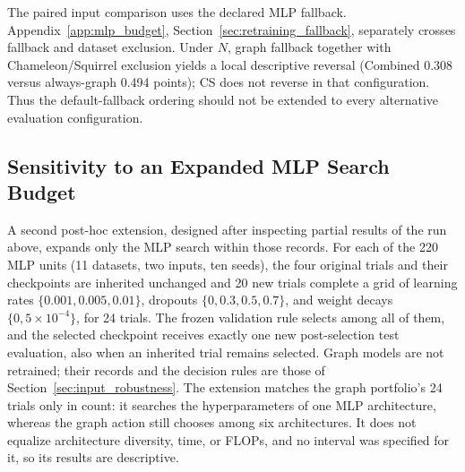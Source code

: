 The paired input comparison uses the declared MLP fallback. Appendix~\ref{app:mlp_budget}, Section~\ref{sec:retraining_fallback}, separately crosses fallback and dataset exclusion. Under $N$, graph fallback together with Chameleon/Squirrel exclusion yields a local descriptive reversal (Combined 0.308 versus always-graph 0.494 points); CS does not reverse in that configuration. Thus the default-fallback ordering should not be extended to every alternative evaluation configuration.

\subsection{Sensitivity to an Expanded MLP Search Budget}
\label{sec:mlp_budget}

A second post-hoc extension, designed after inspecting partial results of the run above, expands only the MLP search within those records. For each of the 220 MLP units (11 datasets, two inputs, ten seeds), the four original trials and their checkpoints are inherited unchanged and 20 new trials complete a grid of learning rates $\{0.001,0.005,0.01\}$, dropouts $\{0,0.3,0.5,0.7\}$, and weight decays $\{0,5\times10^{-4}\}$, for 24 trials. The frozen validation rule selects among all of them, and the selected checkpoint receives exactly one new post-selection test evaluation, also when an inherited trial remains selected. Graph models are not retrained; their records and the decision rules are those of Section~\ref{sec:input_robustness}. The extension matches the graph portfolio's 24 trials only in count: it searches the hyperparameters of one MLP architecture, whereas the graph action still chooses among six architectures. It does not equalize architecture diversity, time, or FLOPs, and no interval was specified for it, so its results are descriptive.

